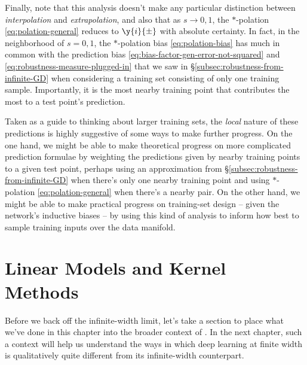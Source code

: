 Finally, note that this analysis doesn't make any particular distinction between \emph{interpolation} and \emph{extrapolation}, and also that as $s\to 0,1$, the $\ast$-polation \eqref{eq:polation-general} reduces to $\y{i}{\pm}$ with absolute certainty. In fact, in the neighborhood of $s=0,1$, the $\ast$-polation bias \eqref{eq:polation-bias} has much in common with the prediction bias \eqref{eq:bias-factor-gen-error-not-squared} and \eqref{eq:robustness-measure-plugged-in} that we saw in \S\ref{subsec:robustness-from-infinite-GD} when considering a training set consisting of only one training sample. Importantly, it is the most nearby training point that contributes the most to a test point's prediction.

Taken as a guide to thinking about larger training sets, the \emph{local} nature of these predictions is highly suggestive of some ways to make further progress. On the one hand, we might be able to make theoretical progress on more complicated prediction formulae by weighting the predictions given by nearby training points to a given test point, perhaps using an approximation from \S\ref{subsec:robustness-from-infinite-GD} when there's only one nearby training point and using $\ast$-polation \eqref{eq:polation-general} when there's a nearby pair. On the other hand, we might be able to make practical progress on training-set design -- given the network's inductive biases -- by using this kind of analysis to inform how best to sample training inputs over the data manifold.












































\section{Linear Models and Kernel Methods}\label{sec:lazy-kernel} 
Before we back off the infinite-width limit, let's take a section to place what we've done in this chapter into the broader context of . In the next chapter, such a context will help us understand  the ways in which deep learning at finite width is qualitatively quite different from its infinite-width counterpart.

